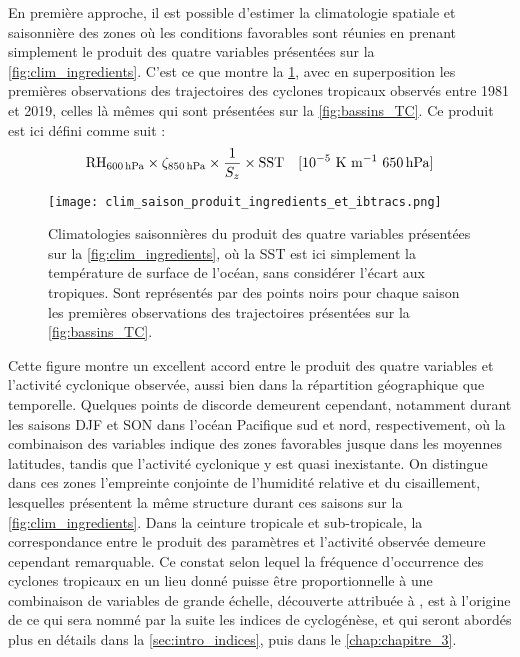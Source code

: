 \documentclass[../main.tex]{subfiles}
\begin{document}
En première approche, il est possible d'estimer la climatologie spatiale et saisonnière des zones où les conditions favorables sont réunies en prenant
simplement le produit des quatre variables présentées sur la \cref{fig:clim_ingredients}. C'est ce que montre la \cref{fig:produit_ingredients}, avec en
superposition les premières observations des trajectoires des cyclones tropicaux observés entre 1981 et 2019, celles là mêmes qui sont présentées sur la
\cref{fig:bassins_TC}. Ce produit est ici défini comme suit :
\begin{equation*}
    \text{RH}_{\hPa{600}} \times \zeta_{\hPa{850}} \times \frac{1}{S_z} \times \text{SST} \quad \text{[$10^{-5}$ K m$^{-1}$ \hPa{650}}]
\end{equation*}
\begin{figure}[tbp]
    \centering
    \texttt{[image: clim\_saison\_produit\_ingredients\_et\_ibtracs.png]}
    \caption{Climatologies saisonnières du produit des quatre variables présentées sur la \cref{fig:clim_ingredients}, où la SST est ici simplement la
    température de surface de l'océan, sans considérer l'écart aux tropiques. Sont représentés par des points noirs pour chaque saison les premières
    observations des trajectoires présentées sur la \cref{fig:bassins_TC}.}
    \label{fig:produit_ingredients}
\end{figure}
\noindent Cette figure montre un excellent accord entre le produit des quatre variables et l'activité cyclonique observée, aussi bien dans la répartition
géographique que temporelle. Quelques points de discorde demeurent cependant, notamment durant les saisons DJF et SON dans l'océan Pacifique sud et nord,
respectivement, où la combinaison des variables indique des zones favorables jusque dans les moyennes latitudes, tandis que l'activité cyclonique y est quasi
inexistante. On distingue dans ces zones l'empreinte conjointe de l'humidité relative et du cisaillement, lesquelles présentent la même structure durant ces
saisons sur la \cref{fig:clim_ingredients}. Dans la ceinture tropicale et sub-tropicale, la correspondance entre le produit des paramètres et l'activité
observée demeure cependant remarquable. Ce constat selon lequel la fréquence d'occurrence des cyclones tropicaux en un lieu donné puisse être proportionnelle à
une combinaison de variables de grande échelle, découverte attribuée à \cite{gray_tropical_1975}, est à l'origine de ce qui sera nommé par la suite les indices
de cyclogénèse, et qui seront abordés plus en détails dans la \cref{sec:intro_indices}, puis dans le \cref{chap:chapitre_3}.
\end{document}
